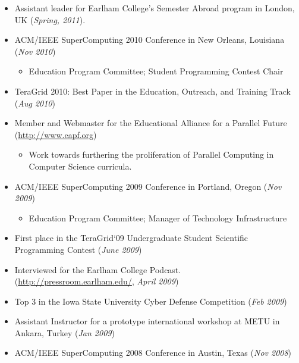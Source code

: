 \documentclass[10pt]{article}
\begin{document}
\begin{itemize}
  \addtolength{\itemsep}{-2mm}
	\item \indent Assistant leader for Earlham College's Semester Abroad program in London, UK (\emph{Spring, 2011}).
	\item \indent ACM/IEEE SuperComputing 2010 Conference in New Orleans, Louisiana (\emph{Nov 2010})
		\vspace{-2mm}
		\begin{itemize}
			\item \indent Education Program Committee; Student Programming Contest Chair
		\end{itemize}
		\vspace{-1mm}
	\item \indent TeraGrid 2010: Best Paper in the Education, Outreach, and Training Track (\emph{Aug 2010})
	\item \indent Member and Webmaster for the Educational Alliance for a Parallel Future (\url{http://www.eapf.org})
		\vspace{-2mm}
		\begin{itemize}
			\item \indent Work towards furthering the proliferation of Parallel Computing in Computer Science curricula.
		\end{itemize}
		\vspace{-1mm}
  \item \indent ACM/IEEE SuperComputing 2009 Conference in Portland, Oregon (\emph{Nov 2009})
		\vspace{-2mm}
		\begin{itemize}
			\item \indent Education Program Committee; Manager of Technology Infrastructure
		\end{itemize}
		\vspace{-1mm}
	\item \indent First place in the TeraGrid`09 Undergraduate Student Scientific Programming Contest (\emph{June 2009})
	\item \indent Interviewed for the Earlham College Podcast. (\url{http://pressroom.earlham.edu/}, \emph{April 2009})
  \item \indent Top 3 in the Iowa State University Cyber Defense Competition (\emph{Feb 2009})
  \item \indent Assistant Instructor for a prototype international workshop at METU in Ankara, Turkey (\emph{Jan 2009})
  \item \indent ACM/IEEE SuperComputing 2008 Conference in Austin, Texas (\emph{Nov 2008})

\end{itemize}
\end{document}
